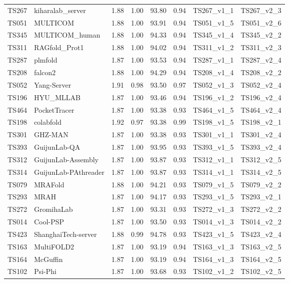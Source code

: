 \begin{longtable}{llllllll}
TS267 & kiharalab\_server & 1.88 & 1.00 & 93.80 & 0.94 & TS267\_v1\_1 & TS267\_v2\_3 \\ 
TS051 & MULTICOM & 1.88 & 1.00 & 93.91 & 0.94 & TS051\_v1\_5 & TS051\_v2\_6 \\ 
TS345 & MULTICOM\_human & 1.88 & 1.00 & 94.33 & 0.94 & TS345\_v1\_4 & TS345\_v2\_2 \\ 
TS311 & RAGfold\_Prot1 & 1.88 & 1.00 & 94.02 & 0.94 & TS311\_v1\_2 & TS311\_v2\_3 \\ 
TS287 & plmfold & 1.87 & 1.00 & 93.53 & 0.94 & TS287\_v1\_1 & TS287\_v2\_4 \\ 
TS208 & falcon2 & 1.88 & 1.00 & 94.29 & 0.94 & TS208\_v1\_4 & TS208\_v2\_2 \\ 
TS052 & Yang-Server & 1.91 & 0.98 & 93.50 & 0.97 & TS052\_v1\_3 & TS052\_v2\_4 \\ 
TS196 & HYU\_MLLAB & 1.87 & 1.00 & 93.46 & 0.94 & TS196\_v1\_2 & TS196\_v2\_4 \\ 
TS464 & PocketTracer & 1.87 & 1.00 & 93.38 & 0.93 & TS464\_v1\_5 & TS464\_v2\_4 \\ 
TS198 & colabfold & 1.92 & 0.97 & 93.38 & 0.99 & TS198\_v1\_5 & TS198\_v2\_1 \\ 
TS301 & GHZ-MAN & 1.87 & 1.00 & 93.38 & 0.93 & TS301\_v1\_1 & TS301\_v2\_4 \\ 
TS393 & GuijunLab-QA & 1.87 & 1.00 & 93.95 & 0.93 & TS393\_v1\_5 & TS393\_v2\_4 \\ 
TS312 & GuijunLab-Assembly & 1.87 & 1.00 & 93.87 & 0.93 & TS312\_v1\_1 & TS312\_v2\_5 \\ 
TS314 & GuijunLab-PAthreader & 1.87 & 1.00 & 93.87 & 0.93 & TS314\_v1\_1 & TS314\_v2\_5 \\ 
TS079 & MRAFold & 1.88 & 1.00 & 94.21 & 0.93 & TS079\_v1\_5 & TS079\_v2\_2 \\ 
TS293 & MRAH & 1.87 & 1.00 & 94.17 & 0.93 & TS293\_v1\_5 & TS293\_v2\_1 \\ 
TS272 & GromihaLab & 1.87 & 1.00 & 93.31 & 0.93 & TS272\_v1\_3 & TS272\_v2\_2 \\ 
TS014 & Cool-PSP & 1.87 & 1.00 & 93.50 & 0.93 & TS014\_v1\_3 & TS014\_v2\_2 \\ 
TS423 & ShanghaiTech-server & 1.88 & 0.99 & 94.78 & 0.93 & TS423\_v1\_5 & TS423\_v2\_4 \\ 
TS163 & MultiFOLD2 & 1.87 & 1.00 & 93.19 & 0.94 & TS163\_v1\_3 & TS163\_v2\_5 \\ 
TS164 & McGuffin & 1.87 & 1.00 & 93.19 & 0.94 & TS164\_v1\_3 & TS164\_v2\_5 \\ 
TS102 & Psi-Phi & 1.87 & 1.00 & 93.68 & 0.93 & TS102\_v1\_2 & TS102\_v2\_5 \\ 

\end{longtable}
